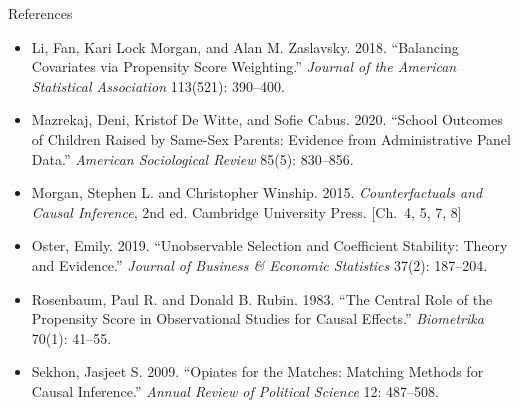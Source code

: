 \documentclass[aspectratio=169,11pt,xcolor=dvipsnames]{beamer}
\begin{document}
\begin{frame}[allowframebreaks,t]{References}
\begin{itemize}
Robustness.'' \textit{Statistical Science} 22(4): 523--539.
\item Li, Fan, Kari Lock Morgan, and Alan M. Zaslavsky. 2018. ``Balancing
Covariates via Propensity Score Weighting.'' \textit{Journal of the American
Statistical Association} 113(521): 390--400.
\item Mazrekaj, Deni, Kristof De Witte, and Sofie Cabus. 2020. ``School Outcomes
of Children Raised by Same-Sex Parents: Evidence from Administrative Panel
Data.'' \textit{American Sociological Review} 85(5): 830--856.
\item Morgan, Stephen L. and Christopher Winship. 2015.
\textit{Counterfactuals and Causal Inference}, 2nd ed. Cambridge University
Press. [Ch.\ 4, 5, 7, 8]
\item Oster, Emily. 2019. ``Unobservable Selection and Coefficient Stability:
Theory and Evidence.'' \textit{Journal of Business \& Economic Statistics}
37(2): 187--204.
\item Rosenbaum, Paul R. and Donald B. Rubin. 1983. ``The Central Role of the
Propensity Score in Observational Studies for Causal Effects.''
\textit{Biometrika} 70(1): 41--55.
\item Sekhon, Jasjeet S. 2009. ``Opiates for the Matches: Matching Methods for
Causal Inference.'' \textit{Annual Review of Political Science} 12: 487--508.
\end{itemize}
\end{frame}
\end{document}

